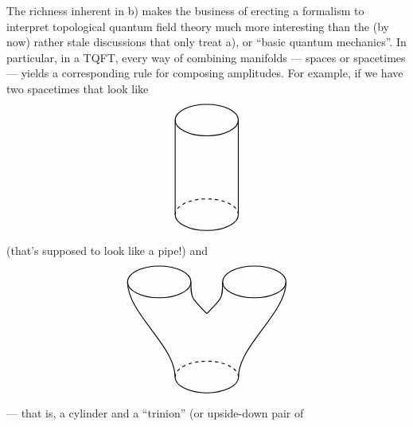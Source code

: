 \documentclass{article}
\begin{document}
The richness inherent in b) makes the business of erecting a formalism
to interpret topological quantum field theory much more interesting than
the (by now) rather stale discussions that only treat a), or ``basic
quantum mechanics''. In particular, in a TQFT, every way of combining
manifolds --- spaces or spacetimes --- yields a corresponding rule for
composing amplitudes. For example, if we have two spacetimes that look
like \[
  \begin{tikzpicture}[scale=0.5]
    \draw[thick] (0,0) ellipse (2cm and 1cm);
    \draw[thick] (-2,0) to (-2,-6);
    \draw[thick] (2,0) to (2,-6);
    \begin{scope}[shift={(0,-6)}]
      \draw[thick,dashed] (0:2cm and 1cm) arc (0:180:2cm and 1cm);
      \draw[thick] (180:2cm and 1cm) arc (180:360:2cm and 1cm);
    \end{scope}
  \end{tikzpicture}
\] (that's supposed to look like a pipe!) and \[
  \begin{tikzpicture}[scale=0.5]
    \draw[thick] (-3,0) ellipse (2cm and 1cm);
    \draw[thick] (3,0) ellipse (2cm and 1cm);
    \draw[thick] (-5,0) .. controls (-5,-2) and (-2,-4) .. (-2,-6);
    \draw[thick] (5,0) .. controls (5,-2) and (2,-4) .. (2,-6);
    \draw[thick] (-1,0) .. controls (-1,-1) .. (0,-2);
    \draw[thick] (1,0) .. controls (1,-1) .. (0,-2);
    \begin{scope}[shift={(0,-6)}]
      \draw[thick,dashed] (0:2cm and 1cm) arc (0:180:2cm and 1cm);
      \draw[thick] (180:2cm and 1cm) arc (180:360:2cm and 1cm);
    \end{scope}
  \end{tikzpicture}
\] --- that is, a cylinder and a ``trinion'' (or upside-down pair of
\end{document}

